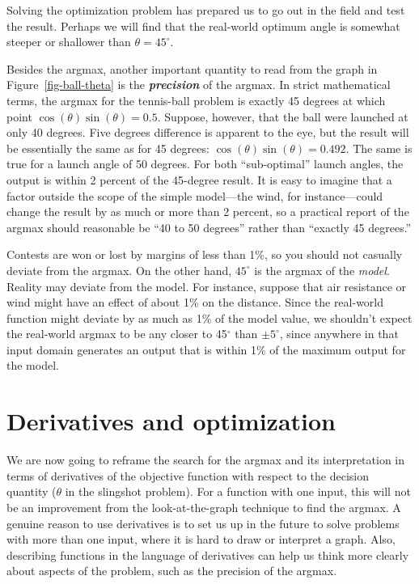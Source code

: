 \documentclass[
  letterpaper,
  DIV=11,
  numbers=noendperiod,
  oneside]{scrreprt}
\begin{document}
Solving the optimization problem has prepared us to go out in the field
and test the result. Perhaps we will find that the real-world optimum
angle is somewhat steeper or shallower than \(\theta = 45^\circ\).

Besides the argmax, another important quantity to read from the graph in
Figure~\ref{fig-ball-theta} is the \textbf{\emph{precision}} of the
argmax. In strict mathematical terms, the argmax for the tennis-ball
problem is exactly 45 degrees at which point
\(\cos(\theta)\sin(\theta) = 0.5\). Suppose, however, that the ball were
launched at only 40 degrees. Five degrees difference is apparent to the
eye, but the result will be essentially the same as for 45 degrees:
\(\cos(\theta)\sin(\theta) = 0.492\). The same is true for a launch
angle of 50 degrees. For both ``sub-optimal'' launch angles, the output
is within 2 percent of the 45-degree result. It is easy to imagine that
a factor outside the scope of the simple model---the wind, for
instance---could change the result by as much or more than 2 percent, so
a practical report of the argmax should reasonable be ``40 to 50
degrees'' rather than ``exactly 45 degrees.''

Contests are won or lost by margins of less than 1\%, so you should not
casually deviate from the argmax. On the other hand, \(45^\circ\) is the
argmax of the \emph{model}. Reality may deviate from the model. For
instance, suppose that air resistance or wind might have an effect of
about 1\% on the distance. Since the real-world function might deviate
by as much as 1\% of the model value, we shouldn't expect the real-world
argmax to be any closer to 45\(^\circ\) than \(\pm 5^\circ\), since
anywhere in that input domain generates an output that is within 1\% of
the maximum output for the model.

\hypertarget{derivatives-and-optimization}{%
\section{Derivatives and
optimization}\label{derivatives-and-optimization}}

We are now going to reframe the search for the argmax and its
interpretation in terms of derivatives of the objective function with
respect to the decision quantity (\(\theta\) in the slingshot problem).
For a function with one input, this will not be an improvement from the
look-at-the-graph technique to find the argmax. A genuine reason to use
derivatives is to set us up in the future to solve problems with more
than one input, where it is hard to draw or interpret a graph. Also,
describing functions in the language of derivatives can help us think
more clearly about aspects of the problem, such as the precision of the
argmax.
\end{document}
